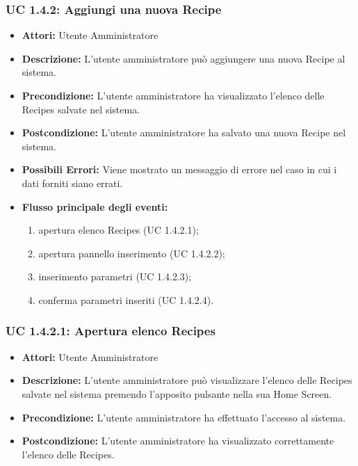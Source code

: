 \subsubsection{UC 1.4.2: Aggiungi una nuova Recipe}

\begin{itemize}
    \item \textbf{Attori:} Utente Amministratore
    \item \textbf{Descrizione:} L'utente amministratore può aggiungere una nuova Recipe al sistema.
    \item \textbf{Precondizione:} L'utente amministratore ha visualizzato l'elenco delle Recipes salvate nel sistema.
    \item \textbf{Postcondizione:} L'utente amministratore ha salvato una nuova Recipe nel sistema.
	\item \textbf{Possibili Errori:}
    Viene mostrato un messaggio di errore nel caso in cui i dati forniti siano errati.
    \item \textbf{Flusso principale degli eventi:}

    \begin{enumerate}
        \item apertura elenco Recipes (UC 1.4.2.1);
        \item apertura pannello inserimento (UC 1.4.2.2);
        \item inserimento parametri (UC 1.4.2.3);
        \item conferma parametri inseriti (UC 1.4.2.4).
    \end{enumerate}

\end{itemize}

\subsubsection{UC 1.4.2.1: Apertura elenco Recipes}

\begin{itemize}
    \item \textbf{Attori:} Utente Amministratore
    \item \textbf{Descrizione:} L'utente amministratore può visualizzare l'elenco delle Recipes salvate nel sistema premendo l'apposito pulsante nella sua Home Screen.
    \item \textbf{Precondizione:} L'utente amministratore ha effettuato l'accesso al sistema.
    \item \textbf{Postcondizione:} L'utente amministratore ha visualizzato correttamente l'elenco delle Recipes.
\end{itemize}

